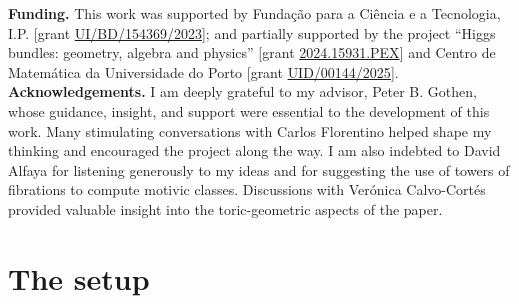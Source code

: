 \documentclass{amsart}
\theoremstyle{plain}
\numberwithin{equation}{section}
\theoremstyle{definition}
\theoremstyle{remark}
\begin{document}
	\newline
	\newline
	\textbf{Funding.} This work was supported by Fundação para a Ciência e a Tecnologia, I.P. [grant \hyperref{https://doi.org/10.54499/UI/BD/154369/2023}{}{}{UI/BD/154369/2023}]; and partially supported by the project ``Higgs bundles: geometry, algebra and physics'' [grant \hyperref{https://doi.org/10.54499/2024.15931.PEX}{}{}{2024.15931.PEX}] and Centro de Matemática da Universidade do Porto [grant \hyperref{https://doi.org/10.54499/UID/00144/2025}{}{}{UID/00144/2025}].
	\newline
	\newline
	\textbf{Acknowledgements.} I am deeply grateful to my advisor, Peter B. Gothen, whose guidance, insight, and support were essential to the development of this work. Many stimulating conversations with Carlos Florentino helped shape my thinking and encouraged the project along the way. I am also indebted to David Alfaya for listening generously to my ideas and for suggesting the use of towers of fibrations to compute motivic classes. Discussions with Verónica Calvo-Cortés provided valuable insight into the toric-geometric aspects of the paper.
	\section{The setup}\label{theSetup}
\end{document}
